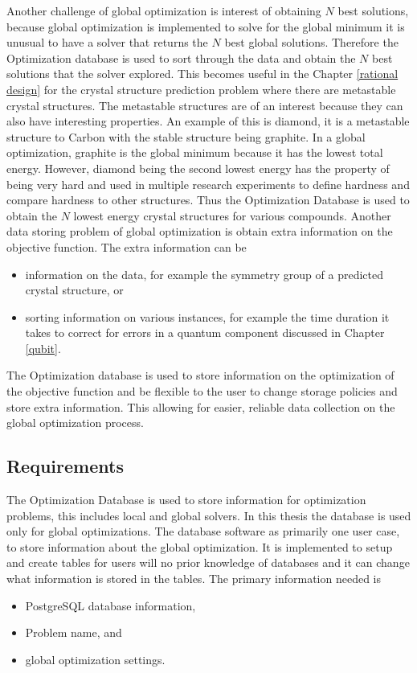 Another challenge of global optimization is interest of obtaining $N$ best solutions, because global optimization is implemented to solve for the global minimum it is unusual to have a solver that returns the $N$ best global solutions. Therefore the Optimization database is used to sort through the data and obtain the $N$ best solutions that the solver explored. This becomes useful in the Chapter \ref{rational design} for the crystal structure prediction problem where there are
metastable crystal structures. The metastable structures are of an interest because they can also have interesting properties. An example of this is diamond, it is a metastable structure to Carbon with the stable structure being graphite. In a global optimization, graphite is the global minimum because it has the lowest total energy. However, diamond being the second lowest energy has the property of being very hard and used in multiple research experiments to define hardness and compare
hardness to other structures. Thus the Optimization Database is used to obtain the $N$ lowest energy crystal structures for various compounds. Another data storing problem of global optimization is obtain extra information on the objective function. The extra information can be
\begin{itemize}
    \item information on the data, for example the symmetry group of a predicted crystal structure, or
    \item sorting information on various instances, for example the time duration it takes to correct for errors in a quantum component discussed in Chapter \ref{qubit}.
\end{itemize}
The Optimization database is used to store information on the optimization of the objective function and be flexible to the user to change storage policies and store extra information. This allowing for easier, reliable data collection on the global optimization process.
\subsection{Requirements}

The Optimization Database is used to store information for optimization problems, this includes local and global solvers. In this thesis the database is used only for global optimizations. The database software as primarily one user case, to store information about the global optimization. It is implemented to setup and create tables for users will no prior knowledge of databases and it can change what information is stored in the tables. The primary information needed is
\begin{itemize}
    \item PostgreSQL database information, 
    \item Problem name, and 
    \item global optimization settings.
\end{itemize}

